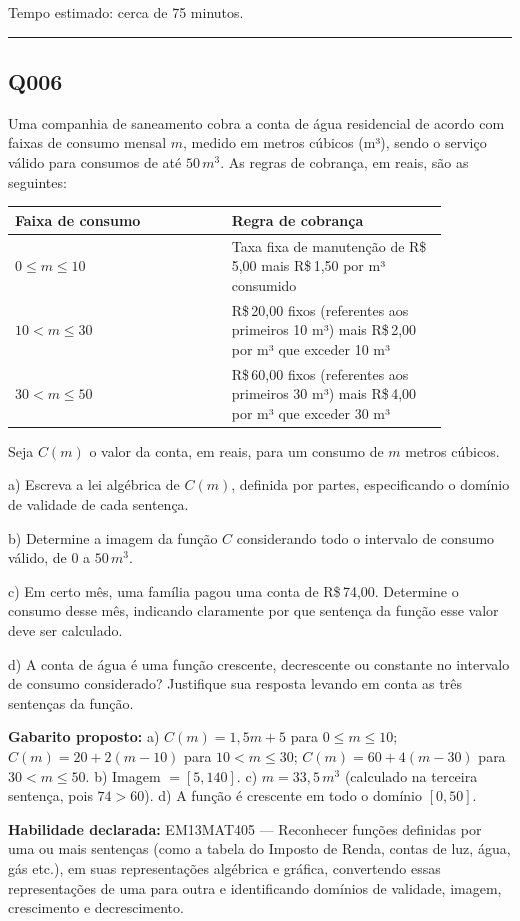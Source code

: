 \documentclass[11pt,a4paper]{article}
\begin{document}
Tempo estimado: cerca de 75 minutos.
\bigskip\hrule\bigskip
\begin{samepage}
\subsection*{Q006}
Uma companhia de saneamento cobra a conta de água residencial de acordo com faixas de consumo mensal $m$, medido em metros cúbicos (m³), sendo o serviço válido para consumos de até $50\,m^3$. As regras de cobrança, em reais, são as seguintes:

\begin{center}
\begin{tabular}{|p{0.430\linewidth}|p{0.430\linewidth}|}
\hline
\textbf{Faixa de consumo} & \textbf{Regra de cobrança} \\
\hline
$0 \le m \le 10$ & Taxa fixa de manutenção de R\$\,5,00 mais R\$\,1,50 por m³ consumido \\
\hline
$10 < m \le 30$ & R\$\,20,00 fixos (referentes aos primeiros 10 m³) mais R\$\,2,00 por m³ que exceder 10 m³ \\
\hline
$30 < m \le 50$ & R\$\,60,00 fixos (referentes aos primeiros 30 m³) mais R\$\,4,00 por m³ que exceder 30 m³ \\
\hline
\end{tabular}
\end{center}

Seja $C(m)$ o valor da conta, em reais, para um consumo de $m$ metros cúbicos.

a) Escreva a lei algébrica de $C(m)$, definida por partes, especificando o domínio de validade de cada sentença.

b) Determine a imagem da função $C$ considerando todo o intervalo de consumo válido, de $0$ a $50\,m^3$.

c) Em certo mês, uma família pagou uma conta de R\$\,74,00. Determine o consumo desse mês, indicando claramente por que sentença da função esse valor deve ser calculado.

d) A conta de água é uma função crescente, decrescente ou constante no intervalo de consumo considerado? Justifique sua resposta levando em conta as três sentenças da função.

\textbf{Gabarito proposto:} a) $C(m) = 1{,}5m+5$ para $0\le m\le10$; $C(m)=20+2(m-10)$ para $10<m\le30$; $C(m)=60+4(m-30)$ para $30<m\le50$. b) Imagem $=[5,140]$. c) $m=33{,}5\,m^3$ (calculado na terceira sentença, pois $74>60$). d) A função é crescente em todo o domínio $[0,50]$.

\textbf{Habilidade declarada:} EM13MAT405 --- Reconhecer funções definidas por uma ou mais sentenças (como a tabela do Imposto de Renda, contas de luz, água, gás etc.), em suas representações algébrica e gráfica, convertendo essas representações de uma para outra e identificando domínios de validade, imagem, crescimento e decrescimento.
\end{samepage}
\end{document}
